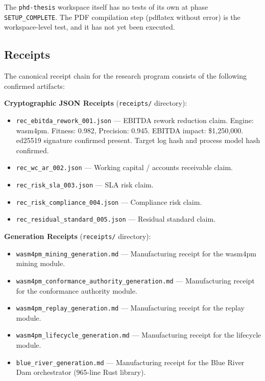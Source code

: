 The \texttt{phd-thesis} workspace itself has no tests of its own at phase
\texttt{SETUP\_COMPLETE}. The PDF compilation step (pdflatex without error) is the
workspace-level test, and it has not yet been executed.

\subsection{Receipts}
\label{sec:phd-thesis-evidence-receipts}

The canonical receipt chain for the research program consists of the following confirmed
artifacts:

\textbf{Cryptographic JSON Receipts} (\texttt{receipts/} directory):
\begin{itemize}
  \item \texttt{rec\_ebitda\_rework\_001.json} --- EBITDA rework reduction claim.
    Engine: wasm4pm. Fitness: 0.982, Precision: 0.945. EBITDA impact: \$1,250,000.
    ed25519 signature confirmed present. Target log hash and process model hash confirmed.
  \item \texttt{rec\_wc\_ar\_002.json} --- Working capital / accounts receivable claim.
  \item \texttt{rec\_risk\_sla\_003.json} --- SLA risk claim.
  \item \texttt{rec\_risk\_compliance\_004.json} --- Compliance risk claim.
  \item \texttt{rec\_residual\_standard\_005.json} --- Residual standard claim.
\end{itemize}

\textbf{Generation Receipts} (\texttt{receipts/} directory):
\begin{itemize}
  \item \texttt{wasm4pm\_mining\_generation.md} --- Manufacturing receipt for the wasm4pm
    mining module.
  \item \texttt{wasm4pm\_conformance\_authority\_generation.md} --- Manufacturing receipt for
    the conformance authority module.
  \item \texttt{wasm4pm\_replay\_generation.md} --- Manufacturing receipt for the replay
    module.
  \item \texttt{wasm4pm\_lifecycle\_generation.md} --- Manufacturing receipt for the
    lifecycle module.
  \item \texttt{blue\_river\_generation.md} --- Manufacturing receipt for the Blue River Dam
    orchestrator (965-line Rust library).
\end{itemize}

